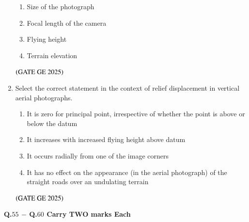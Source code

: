 \documentclass[journal,12pt,onecolumn]{IEEEtran}
\theoremstyle{remark}
\begin{document}
\begin{enumerate}
\begin{enumerate}

\item Size of the photograph
\item Focal length of the camera
\item Flying height
\item Terrain elevation

\end{enumerate}
\hfill $\left(\text{GATE GE 2025}\right)$
\bigskip
\item Select the correct statement in the context of relief displacement in vertical aerial photographs.
\begin{enumerate}
\item It is zero for principal point, irrespective of whether the point is above or below the datum
\item It increases with increased flying height above datum
\item It occurs radially from one of the image corners
\item It has no effect on the appearance (in the aerial photograph) of the straight roads over an undulating terrain
\end{enumerate}
\hfill $\left(\text{GATE GE 2025}\right)$
\bigskip
\end{enumerate}

\textbf{Q.$55$ $-$ Q.$60$ Carry TWO marks Each}\\
\end{document}
